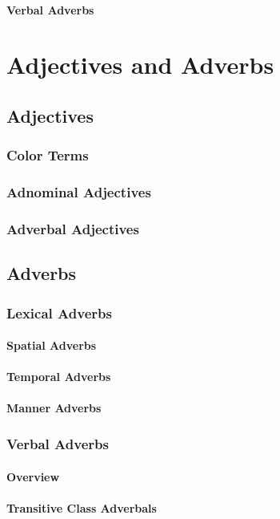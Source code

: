 \documentclass[a4paper, 12pt, oneside]{memoir}
\begin{document}
\subsubsection{Verbal Adverbs}
\chapter{Adjectives and Adverbs}\label{c:adjectivesadverbs}
\section{Adjectives}
\subsection{Color Terms}
\subsection{Adnominal Adjectives}
\subsection{Adverbal Adjectives}
\section{Adverbs}
\subsection{Lexical Adverbs}
\subsubsection{Spatial Adverbs}
\subsubsection{Temporal Adverbs}
\subsubsection{Manner Adverbs}
\subsection{Verbal Adverbs}
\subsubsection{Overview}
\subsubsection{Transitive Class Adverbals}
\end{document}
